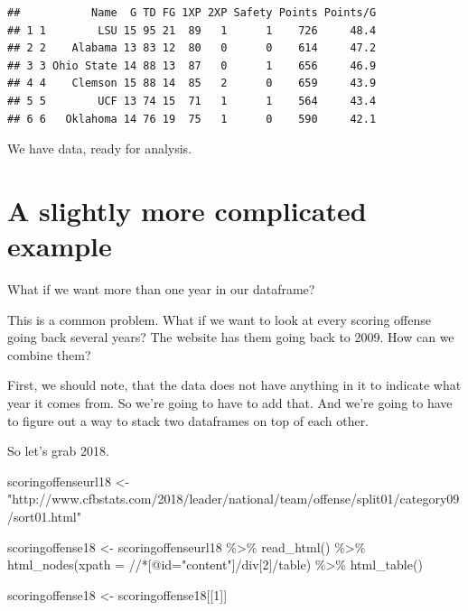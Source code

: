 \documentclass[
]{book}
\newenvironment{Shaded}{\begin{snugshade}}{\end{snugshade}}
\newcommand{\AttributeTok}[1]{\textcolor[rgb]{0.77,0.63,0.00}{#1}}
\newcommand{\DecValTok}[1]{\textcolor[rgb]{0.00,0.00,0.81}{#1}}
\newcommand{\FunctionTok}[1]{\textcolor[rgb]{0.00,0.00,0.00}{#1}}
\newcommand{\NormalTok}[1]{#1}
\newcommand{\OtherTok}[1]{\textcolor[rgb]{0.56,0.35,0.01}{#1}}
\newcommand{\SpecialCharTok}[1]{\textcolor[rgb]{0.00,0.00,0.00}{#1}}
\newcommand{\StringTok}[1]{\textcolor[rgb]{0.31,0.60,0.02}{#1}}
\begin{document}
\begin{verbatim}
##           Name  G TD FG 1XP 2XP Safety Points Points/G
## 1 1        LSU 15 95 21  89   1      1    726     48.4
## 2 2    Alabama 13 83 12  80   0      0    614     47.2
## 3 3 Ohio State 14 88 13  87   0      1    656     46.9
## 4 4    Clemson 15 88 14  85   2      0    659     43.9
## 5 5        UCF 13 74 15  71   1      1    564     43.4
## 6 6   Oklahoma 14 76 19  75   1      0    590     42.1
\end{verbatim}

We have data, ready for analysis.

\hypertarget{a-slightly-more-complicated-example}{%
\section{A slightly more complicated example}\label{a-slightly-more-complicated-example}}

What if we want more than one year in our dataframe?

This is a common problem. What if we want to look at every scoring offense going back several years? The website has them going back to 2009. How can we combine them?

First, we should note, that the data does not have anything in it to indicate what year it comes from. So we're going to have to add that. And we're going to have to figure out a way to stack two dataframes on top of each other.

So let's grab 2018.

\begin{Shaded}
\begin{Highlighting}[]
\NormalTok{scoringoffenseurl18 }\OtherTok{\textless{}{-}} \StringTok{"http://www.cfbstats.com/2018/leader/national/team/offense/split01/category09/sort01.html"}

\NormalTok{scoringoffense18 }\OtherTok{\textless{}{-}}\NormalTok{ scoringoffenseurl18 }\SpecialCharTok{\%\textgreater{}\%}
  \FunctionTok{read\_html}\NormalTok{() }\SpecialCharTok{\%\textgreater{}\%}
  \FunctionTok{html\_nodes}\NormalTok{(}\AttributeTok{xpath =} \StringTok{\textquotesingle{}//*[@id="content"]/div[2]/table\textquotesingle{}}\NormalTok{) }\SpecialCharTok{\%\textgreater{}\%}
  \FunctionTok{html\_table}\NormalTok{()}

\NormalTok{scoringoffense18 }\OtherTok{\textless{}{-}}\NormalTok{ scoringoffense18[[}\DecValTok{1}\NormalTok{]]}
\end{Highlighting}
\end{Shaded}
\end{document}
